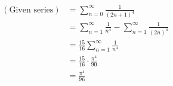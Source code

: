 \item

\begin{align*}
	(\text{Given series})
	 & = \sum_{n = 0}^\infty \frac{1}{{(2n + 1)}^4}                                 \\
	 & = \sum_{n = 1}^\infty \frac{1}{n^4} - \sum_{n = 1}^\infty \frac{1}{{(2n)}^4} \\
	 & = \frac{15}{16} \sum_{n = 1}^\infty \frac{1}{n^4}                            \\
	 & = \frac{15}{16} \cdot \frac{\pi^4}{90}                                       \\
	 & = \frac{\pi^4}{96}
\end{align*}
